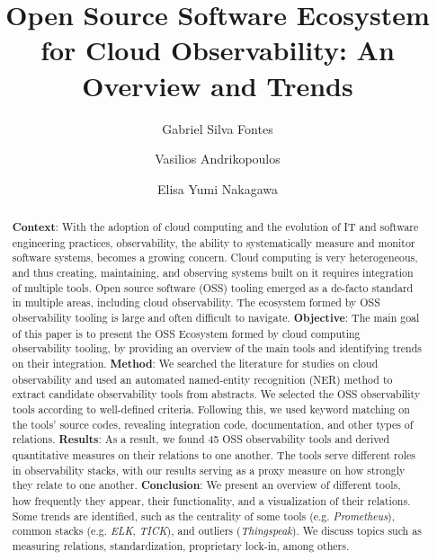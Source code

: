 \documentclass[sigconf]{acmart}
\begin{document}
\title{Open Source Software Ecosystem for Cloud Observability: An Overview and Trends}

\author{Gabriel Silva Fontes}

\author{Vasilios Andrikopoulos}

\author{Elisa Yumi Nakagawa}

\renewcommand{\shortauthors}{Fontes et al.}

\begin{abstract}

  \textbf{Context}: With the adoption of cloud computing and the evolution
  of IT and software engineering practices, observability, the ability to
  systematically measure and monitor software systems, becomes a growing
  concern. Cloud computing is very heterogeneous, and thus creating,
  maintaining, and observing systems built on it requires integration of
  multiple tools. Open source software (OSS) tooling emerged as a de-facto
  standard in multiple areas, including cloud observability. The ecosystem
  formed by OSS observability tooling is large and often difficult to
  navigate.
  \textbf{Objective}: The main goal of this paper is to present
  the OSS Ecosystem formed by cloud computing observability tooling, by
  providing an overview of the main tools and identifying trends on their
  integration.
  \textbf{Method}: We searched the literature for studies on
  cloud observability and used an automated named-entity recognition (NER)
  method to extract candidate observability tools from abstracts. We
  selected the OSS observability tools according to well-defined criteria.
  Following this, we used keyword matching on the tools' source codes,
  revealing integration code, documentation, and other types of relations.
  \textbf{Results}: As a result, we found 45 OSS observability tools and
  derived quantitative measures on their relations to one another. The
  tools serve different roles in observability stacks, with our results
  serving as a proxy measure on how strongly they relate to one another.
  \textbf{Conclusion}: We present an overview of different tools, how
  frequently they appear, their functionality, and a visualization of
  their relations. Some trends are identified, such as the centrality of
  some tools (e.g. \emph{Prometheus}), common stacks (e.g. \emph{ELK},
  \emph{TICK}), and outliers (\emph{Thingspeak}). We discuss topics such
  as measuring relations, standardization, proprietary lock-in, among
  others.

\end{abstract}
\end{document}
